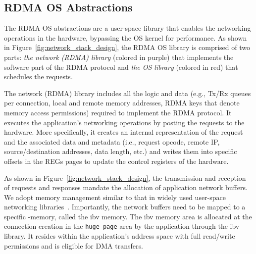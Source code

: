 \subsection{RDMA OS Abstractions} 
The RDMA OS abstractions are a user-space library that enables the networking operations in the \projecttitle{} hardware, bypassing the OS kernel for performance. 
As shown in Figure~\ref{fig:network_stack_design}, the RDMA OS library is comprised of two parts: \textit{the network (RDMA) library} (colored in purple) that implements the software part of the RDMA protocol and \textit{the OS library} (colored in red) that schedules the \projecttitle{} requests. 





  The network (RDMA) library includes all the logic and data (e.g., Tx/Rx queues per connection, local and remote memory addresses, RDMA keys that denote memory access permissions) required to implement the RDMA protocol. It executes the application's networking operations by posting the requests to the hardware. More specifically, it creates an internal representation of the request and the associated data and metadata (i.e., request opcode, remote IP, source/destination addresses, data length, etc.) and writes them into specific offsets in the REGs pages to update the control registers of the \projecttitle{} hardware. 


As shown in Figure~\ref{fig:network_stack_design}, the transmission and reception of requests and responses mandate the allocation of application network buffers. 
We adopt memory management similar to that in widely used user-space networking libraries~\cite{erpc, dpdk, rdma}.
Importantly, the network buffers need to be mapped to a specific \projecttitle{}-memory, called the ibv memory. The ibv memory area is allocated at the connection creation in the {\tt huge page} area by the application through the ibv library. It resides within the application's address space with full read/write permissions and is eligible for DMA transfers. 

